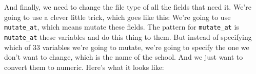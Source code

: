 \documentclass[]{book}
\newenvironment{Shaded}{\begin{snugshade}}{\end{snugshade}}
\newcommand{\KeywordTok}[1]{\textcolor[rgb]{0.13,0.29,0.53}{\textbf{#1}}}
\newcommand{\StringTok}[1]{\textcolor[rgb]{0.31,0.60,0.02}{#1}}
\newcommand{\OperatorTok}[1]{\textcolor[rgb]{0.81,0.36,0.00}{\textbf{#1}}}
\newcommand{\NormalTok}[1]{#1}
\begin{document}
And finally, we need to change the file type of all the fields that need
it. We're going to use a clever little trick, which goes like this:
We're going to use \texttt{mutate\_at}, which means mutate these fields.
The pattern for \texttt{mutate\_at} is \texttt{mutate\_at} these
variables and do this thing to them. But instead of specifying which of
33 variables we're going to mutate, we're going to specify the one we
don't want to change, which is the name of the school. And we just want
to convert them to numeric. Here's what it looks like:

\begin{Shaded}
\end{Shaded}
\end{document}
